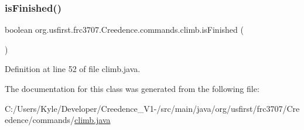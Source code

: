 \subsubsection{\texorpdfstring{isFinished()}{isFinished()}}
{\footnotesize\ttfamily boolean org.\+usfirst.\+frc3707.\+Creedence.\+commands.\+climb.\+is\+Finished (\begin{DoxyParamCaption}{ }\end{DoxyParamCaption})\hspace{0.3cm}{\ttfamily [protected]}}



Definition at line 52 of file climb.\+java.



The documentation for this class was generated from the following file\+:\begin{DoxyCompactItemize}
\item 
C\+:/\+Users/\+Kyle/\+Developer/\+Creedence\+\_\+\+V1-\//src/main/java/org/usfirst/frc3707/\+Creedence/commands/\mbox{\hyperlink{climb_8java}{climb.\+java}}\end{DoxyCompactItemize}
